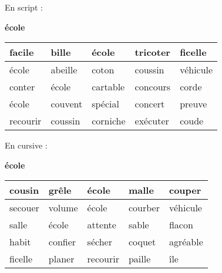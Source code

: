 \documentclass[a4paper, 11pt,oneside, fleqn]{article}
\begin{document}
\begin{onehalfspace}
\large\noindent En script :
\begin{center} {\huge \textbf{école}}
\vspace{0.25cm}\\
\begin{tabulary}{17cm}{|h|h|h|h|h|}
\hline
facile & bille & école & tricoter & ficelle \\
\hline
école & abeille & coton & coussin & véhicule \\
\hline
conter & école & cartable & concours & corde \\
\hline
école & couvent & spécial & concert & preuve \\
\hline
recourir & coussin & corniche & exécuter & coude \\
\hline
\end{tabulary}
\end{center}
\vspace{0.5cm}

\large\noindent En cursive :
\begin{center}
{\huge \textbf {{\cursive école}}}
\vspace{0.25cm}\\
\begin{tabulary}{17cm}{|i|i|i|i|i|}
\hline
cousin & grêle & école & malle & couper \\
\hline
secouer & volume & école & courber & véhicule \\
\hline
salle & école & attente & sable & flacon \\
\hline
habit & confier & sécher & coquet & agréable \\
\hline
ficelle & planer & recourir & paille & île \\
\hline
\end{tabulary}
\end{center}

\end{onehalfspace}
\end{document}
